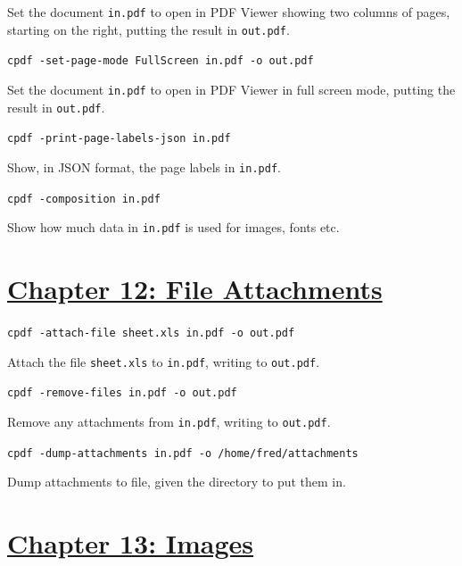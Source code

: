 \documentclass{book}
\begin{document}
\noindent Set the document \texttt{in.pdf} to open in PDF Viewer showing two columns of pages, starting on the right, putting the result in \texttt{out.pdf}.

\begin{framed}\noindent\texttt{cpdf -set-page-mode FullScreen in.pdf -o out.pdf}\end{framed}

\noindent Set the document \texttt{in.pdf} to open in PDF Viewer in full screen mode, putting the result in \texttt{out.pdf}.

\begin{framed}\noindent\texttt{cpdf -print-page-labels-json in.pdf}\end{framed}

\noindent Show, in JSON format, the page labels in \texttt{in.pdf}.

\begin{framed}\noindent\texttt{cpdf -composition in.pdf}\end{framed}

\noindent Show how much data in \texttt{in.pdf} is used for images, fonts etc.

\section*{\hyperref[chap:12]{Chapter 12: File Attachments}}

\begin{framed}\noindent\texttt{cpdf -attach-file sheet.xls in.pdf -o out.pdf}\end{framed}

\noindent Attach the file \texttt{sheet.xls} to \texttt{in.pdf}, writing to \texttt{out.pdf}.

\begin{framed}\noindent\texttt{cpdf -remove-files in.pdf -o out.pdf}\end{framed}

\noindent Remove any attachments from \texttt{in.pdf}, writing to \texttt{out.pdf}.

\begin{framed}\noindent\texttt{cpdf -dump-attachments in.pdf -o /home/fred/attachments}\end{framed}

\noindent Dump attachments to file, given the directory to put them in.

\section*{\hyperref[chap:13]{Chapter 13: Images}}
\end{document}
